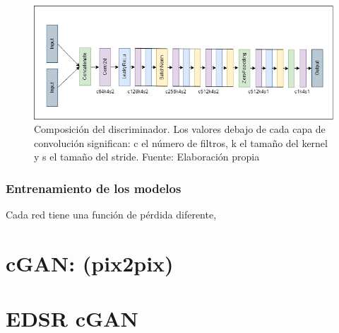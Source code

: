 \begin{figure}[H]
	\centering
	\includegraphics[width=1\textwidth]{figures/discriminator.png}
	\caption{\label{fig:discriminator}Composición del discriminador. Los valores debajo de cada capa de convolución significan: c el número de filtros, k el tamaño del kernel y s el tamaño del stride. Fuente: Elaboración propia}
\end{figure}


\subsubsection{Entrenamiento de los modelos}

Cada red tiene una función de pérdida diferente,

\section{cGAN: (pix2pix)}

\section{EDSR cGAN}